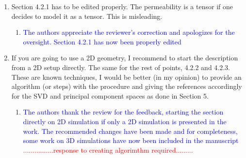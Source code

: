 \documentclass[11pt]{letter} %
\newcommand{\red}{\textcolor{red}}
\newcommand{\blue}{\textcolor{blue}}
\begin{document}
\begin{letter}
{\begin{enumerate}
\begin{enumerate}
\begin{enumerate}
        \end{enumerate}
\item \label{R_R2_TensorCorrection}Section 4.2.1 has to be edited properly. The permeability is a tensor if one decides to model it as a tensor. This is misleading.
  \begin{enumerate}
      \item \label{R_R2_TensorCorrection_1} \blue{The authors appreciate the reviewer's correction and apologizes for the oversight. Section 4.2.1 has now been properly edited}
        \end{enumerate}
  \item \label{R_R2_GeomSetupAlgorithm} If you are going to use a 2D geometry, I recommend to start the description from a 2D setup directly. The same for the rest of points, 4.2.2 and 4.2.3. These are known techniques, I would be better (in my opinion) to provide an algorithm (or steps) with the procedure and giving the references accordingly for the SVD and principal component spaces as done in Section 5.
 \begin{enumerate}
      \item \label{R_R2_GeomSetupAlgorithm_1} \blue{The authors thank the review for the feedback, starting the section directly on 2D simulation if only a 2D simulation is presented in the work. The recommended changes have been made and for completeness, some work on 3D simulations have now been included in the manuscript} \red{................response to creating algorimthm required.........}
        \end{enumerate}
\end{enumerate}
\end{enumerate}
}



\end{letter}
\end{document}
